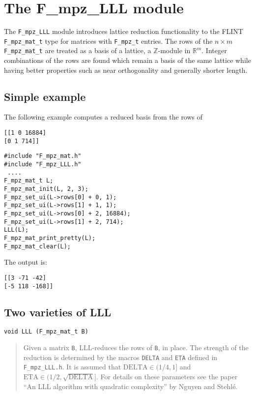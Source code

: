 \documentclass[a4paper,10pt]{article}
\newcommand{\Z}{\mathbb{Z}}
\newcommand{\R}{\mathbb{R}}
\newcommand{\code}{\lstinline}
\begin{document}
\section{The F\_mpz\_LLL module}

The \code{F_mpz_LLL} module introduces lattice reduction functionality to the FLINT \code{F_mpz_mat_t} type for matrices with \code{F_mpz_t} entries.  The rows of the $n \times m$ \code{F_mpz_mat_t} are treated as a basis of a lattice, a $\Z$-module in $\R^{m}$.  Integer combinations of the rows are found which remain a basis of the same lattice while having better properties such as near orthogonality and 
generally shorter length.

\subsection{Simple example}

The following example computes a reduced basis from the rows of 
\begin{lstlisting}
[[1 0 16884]
[0 1 714]]
\end{lstlisting} 

\begin{lstlisting}
#include "F_mpz_mat.h"
#include "F_mpz_LLL.h"
 ....
F_mpz_mat_t L;
F_mpz_mat_init(L, 2, 3);
F_mpz_set_ui(L->rows[0] + 0, 1);
F_mpz_set_ui(L->rows[1] + 1, 1);
F_mpz_set_ui(L->rows[0] + 2, 16884);
F_mpz_set_ui(L->rows[1] + 2, 714);
LLL(L);
F_mpz_mat_print_pretty(L);
F_mpz_mat_clear(L);
\end{lstlisting}

The output is:

\begin{lstlisting}
[[3 -71 -42]
[-5 118 -168]]
\end{lstlisting}

\subsection{Two varieties of LLL}

\begin{lstlisting}
void LLL (F_mpz_mat_t B)
\end{lstlisting}

\begin{quote}
Given a matrix \code{B}, LLL-reduces the rows of \code{B}, in place.  The strength of the reduction is 
determined by the macros \code{DELTA} and \code{ETA} defined in \code{F_mpz_LLL.h}.  It is assumed that 
$\mbox{DELTA} \in (1/4, 1]$ and $\mbox{ETA} \in (1/2, \sqrt{\mbox{DELTA}}]$.  For details on these parameters
 see the paper ``An LLL algorithm with quadratic complexity'' by Nguyen and Stehl\'e.
\end{quote}
\end{document}
